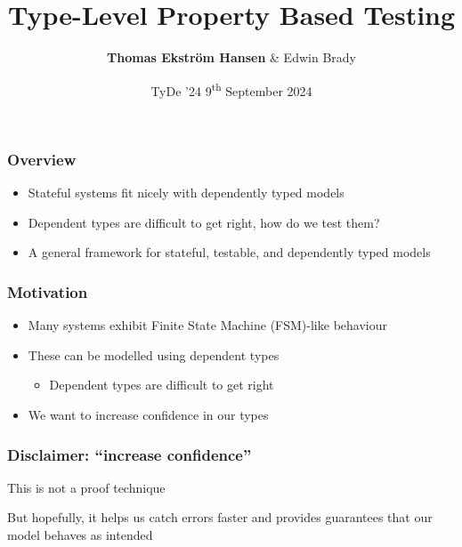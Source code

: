 \documentclass[compress,handout]{beamer}
\title{Type-Level Property Based Testing}
\author{{\bfseries Thomas Ekstr{\" o}m Hansen} \& Edwin Brady}
\date{TyDe '24 {\textemdash} 9\textsuperscript{th} September 2024}
\begin{document}
\maketitle


\begin{frame}
  \frametitle{Overview}

  \begin{itemize}
    \item<1-> Stateful systems fit nicely with dependently typed models
    \item<2-> Dependent types are difficult to get right, how do we test them?
    \item<3-> A general framework for stateful, testable, and dependently typed
              models
  \end{itemize}

\end{frame}


\begin{frame}
  \frametitle{Motivation}

  \begin{itemize}
    \item<1-> Many systems exhibit Finite State Machine (FSM)-like behaviour
    \item<2-> These can be modelled using dependent types
    \begin{itemize}
      \item<2-> Dependent types are difficult to get right
    \end{itemize}
    \item<3-> We want to increase confidence in our types
  \end{itemize}

\end{frame}






\begin{frame}
  \frametitle{Disclaimer: ``increase confidence''}

  \begin{center}
    {\Large
    This is not a proof technique
    }

    {\large
    But hopefully, it helps us catch errors faster and provides guarantees that
    our model behaves as intended
    }
  \end{center}

\end{frame}
\end{document}
